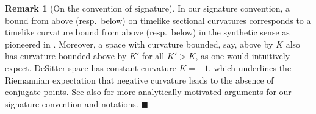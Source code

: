 \documentclass[hidelinks,12pt,a4paper]{article}
\numberwithin{equation}{section}
\theoremstyle{plain}
\theoremstyle{definition}
\newtheorem{remark}[definition]{Remark}
\begin{document}
\begin{remark}[On the convention of signature]
In our signature convention, a bound from above (resp.\ below) on timelike sectional curvatures corresponds to a timelike curvature bound from above (resp.\ below) in the synthetic sense as pioneered in \cite{KS18}. 
Moreover, a space with curvature bounded, say, above by $K$ also has curvature bounded above by $K'$ for all $K' > K$, as one would intuitively expect. 
DeSitter space has constant curvature $K=-1$, which underlines the Riemannian expectation that negative curvature leads to the absence of conjugate points. 
See also \cite[Section 2.1]{GRZ26+} for more analytically motivated arguments for our signature convention and notations. 
\hfill$\blacksquare$ 
\end{remark}

\end{document}
